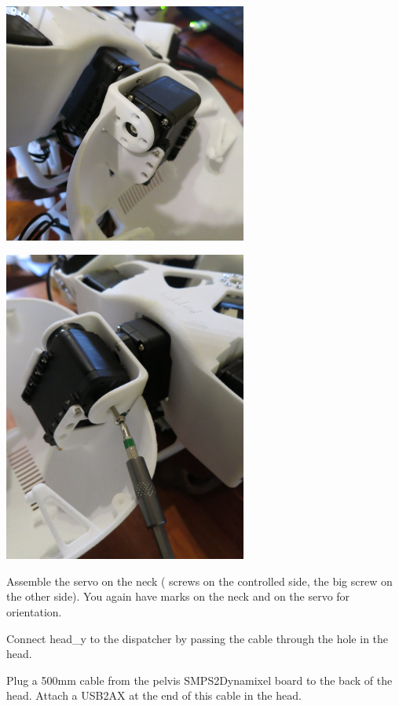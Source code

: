 \documentclass[includefoot]{article}
\begin{document}
  \begin{center}
  \includegraphics[width=0.6\textwidth]{img/neck3}
 \end{center}

  \begin{center}
  \includegraphics[width=0.6\textwidth]{img/neck4}\\
 \end{center}

Assemble the servo on the neck ( screws on the controlled side, the big screw on the other side). You again have marks on the neck and on the servo for orientation.

Connect head\_y to the dispatcher by passing the cable through the hole in the head.

Plug a 500mm cable from the pelvis SMPS2Dynamixel board to the back of the head. Attach a USB2AX at the end of this cable in the head.
\end{document}
